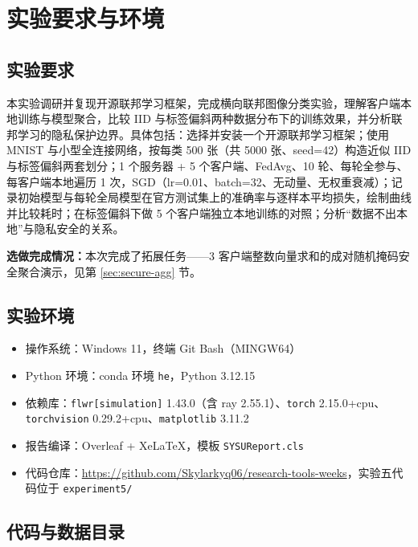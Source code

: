 \documentclass{SYSUReport}
\date{2026 年 11 月 26 日}
\begin{document}
\cover
\thispagestyle{empty}
\clearpage

\tableofcontents
\clearpage

\setcounter{page}{1}

\section{实验要求与环境}

\subsection{实验要求}

本实验调研并复现开源联邦学习框架，完成横向联邦图像分类实验，理解客户端本地训练与模型聚合，比较 IID 与标签偏斜两种数据分布下的训练效果，并分析联邦学习的隐私保护边界。具体包括：选择并安装一个开源联邦学习框架；使用 MNIST 与小型全连接网络，按每类 500 张（共 5000 张、seed=42）构造近似 IID 与标签偏斜两套划分；1 个服务器 + 5 个客户端、FedAvg、10 轮、每轮全参与、每客户端本地遍历 1 次，SGD（lr=0.01、batch=32、无动量、无权重衰减）；记录初始模型与每轮全局模型在官方测试集上的准确率与逐样本平均损失，绘制曲线并比较耗时；在标签偏斜下做 5 个客户端独立本地训练的对照；分析“数据不出本地”与隐私安全的关系。

\textbf{选做完成情况：}本次完成了拓展任务——3 客户端整数向量求和的成对随机掩码安全聚合演示，见第 \ref{sec:secure-agg} 节。

\subsection{实验环境}

\begin{itemize}
  \item 操作系统：Windows 11，终端 Git Bash（MINGW64）
  \item Python 环境：conda 环境 \texttt{he}，Python 3.12.15
  \item 依赖库：\texttt{flwr[simulation]} 1.43.0（含 ray 2.55.1）、\texttt{torch} 2.15.0+cpu、\texttt{torchvision} 0.29.2+cpu、\texttt{matplotlib} 3.11.2
  \item 报告编译：Overleaf + XeLaTeX，模板 \texttt{SYSUReport.cls}
  \item 代码仓库：\url{https://github.com/Skylarkyq06/research-tools-weeks}，实验五代码位于 \texttt{experiment5/}
\end{itemize}

\subsection{代码与数据目录}
\end{document}
